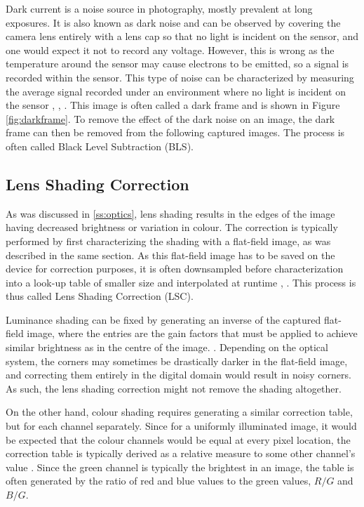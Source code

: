 Dark current is a noise source in photography, mostly prevalent at long exposures. It is also known as dark noise and can be observed by covering the camera lens entirely with a lens cap so that no light is incident on the sensor, and one would expect it not to record any voltage. However, this is wrong as the temperature around the sensor may cause electrons to be emitted, so a signal is recorded within the sensor. This type of noise can be characterized by measuring the average signal recorded under an environment where no light is incident on the sensor \cite[289]{nakamura}, \cite[63, chapter. 3]{rowlands2020physics}, \cite{Ramanath}. This image is often called a dark frame and is shown in Figure \ref{fig:darkframe}. To remove the effect of the dark noise on an image, the dark frame can then be removed from the following captured images. The process is often called Black Level Subtraction (BLS).

\subsection{Lens Shading Correction}

As was discussed in \ref{ss:optics}, lens shading results in the edges of the image having decreased brightness or variation in colour. The correction is typically performed by first characterizing the shading with a flat-field image, as was described in the same section. As this flat-field image has to be saved on the device for correction purposes, it is often downsampled before characterization into a look-up table of smaller size and interpolated at runtime \cite[251]{nakamura}, \cite{Park2016ISP}. This process is thus called Lens Shading Correction (LSC).

Luminance shading can be fixed by generating an inverse of the captured flat-field image, where the entries are the gain factors that must be applied to achieve similar brightness as in the centre of the image. \cite[286-287]{nakamura}. Depending on the optical system, the corners may sometimes be drastically darker in the flat-field image, and correcting them entirely in the digital domain would result in noisy corners. As such, the lens shading correction might not remove the shading altogether.

On the other hand, colour shading requires generating a similar correction table, but for each channel separately. Since for a uniformly illuminated image, it would be expected that the colour channels would be equal at every pixel location, the correction table is typically derived as a relative measure to some other channel's value \cite[286-287]{nakamura}. Since the green channel is typically the brightest in an image, the table is often generated by the ratio of red and blue values to the green values, $R/G$ and $B/G$.

